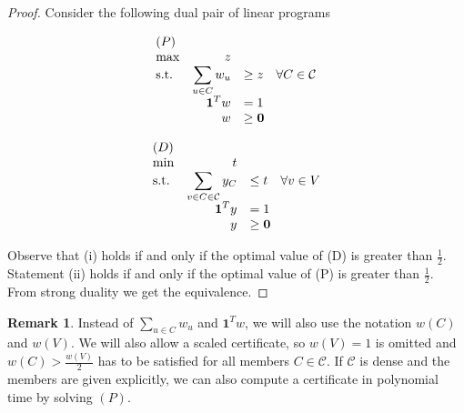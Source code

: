 \documentclass[a4paper, 12pt]{scrbook}
\theoremstyle{definition}
\newtheorem*{remark}{Remark}
\begin{document}
\begin{proof}
    Consider the following dual pair of linear programs
    \newline
    \newline
    \begin{minipage}{.5\linewidth}
        \begin{equation*}
            \begin{array}{l@{\quad} r l l}
                (P)\\
                \max          &z   \\
                \mathrm{s.t.}  &\displaystyle\sum\limits_{u\in C} w_u &\geq  z \quad \forall C \in \mathcal{C} \\
                    & \textbf{1}^Tw &=   1 \\
                    &   w &\geq   \textbf{0}
            \end{array}
        \end{equation*}
    \end{minipage}
    \begin{minipage}{.5\linewidth}
        \begin{equation*}
            \begin{array}{l@{\quad} r l l}
                (D)\\
                \min          &t   \\
                \mathrm{s.t.}  &\displaystyle\sum\limits_{v \in C \in \mathcal{C}} y_C &\leq  t \quad \forall v \in V \\
                    & \textbf{1}^Ty &=   1 \\
                    &   y &\geq   \textbf{0}
            \end{array}
        \end{equation*}
    \end{minipage}
    \newline
    \newline
    Observe that (i) holds if and only if the optimal value of (D) is greater than $\frac 12$. Statement (ii) holds if and only if the optimal value of (P) is greater than $\frac 12$.
    From strong duality we get the equivalence.
\end{proof}

\begin{remark}
    Instead of $\sum_{u \in C} w_u$ and $\textbf{1}^Tw$, we will also use the notation $w(C)$ and $w(V)$. We will also allow a scaled certificate, so $w(V)=1$ is omitted and $w(C) > \frac {w(V)}{2}$ has to be satisfied for all members $C \in \mathcal{C}$. If $\mathcal{C}$ is dense and the members are given explicitly, we can also compute a certificate in polynomial time by solving $(P)$.
\end{remark}
\end{document}
